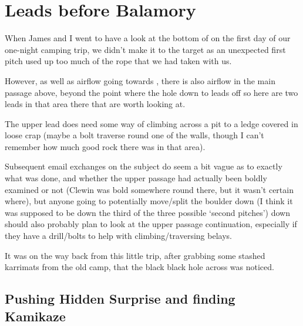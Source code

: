 \section{Leads before Balamory}

When James and I went to have a look at the bottom of  on
the first day of our one-night camping trip, we didn't make it to the
target as an unexpected first pitch used up too much of the rope that we
had taken with us.


However, as well as airflow going towards , there is also
airflow in the main passage above, beyond the point where the hole down
to  leads off so here are two leads in that area there
that are worth looking at.

The upper lead does need some way of climbing across a pit to a
ledge covered in loose crap (maybe a bolt traverse round one of the
walls, though I can't remember how much good rock there was in that
area).

Subsequent email exchanges on the subject do seem a bit vague as to
exactly what was done, and whether the upper passage had actually been
boldly examined or not (Clewin was bold somewhere round there, but it
wasn't certain where), but anyone going to potentially move/split the
boulder down  (I think it was supposed to be down the
third of the three possible `second pitches') down should also probably
plan to look at the upper passage continuation, especially if they have
a drill/bolts to help with climbing/traversing belays.

It was on the way back from this little trip, after grabbing some stashed
karrimats from the old camp, that the black black hole across  was noticed.

\subsection{Pushing Hidden Surprise and finding Kamikaze}


